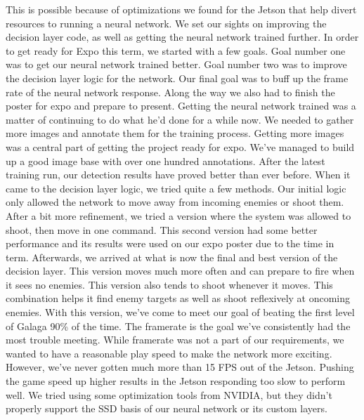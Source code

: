 \documentclass[onecolumn, draftclsnofoot,10pt, compsoc]{IEEEtran}
\begin{document}
This is possible because of optimizations we found for the Jetson that help divert resources to running a neural network.
We set our sights on improving the decision layer code, as well as getting the neural network trained further.
\newline\newline
In order to get ready for Expo this term, we started with a few goals.
Goal number one was to get our neural network trained better.
Goal number two was to improve the decision layer logic for the network.
Our final goal was to buff up the frame rate of the neural network response.
Along the way we also had to finish the poster for expo and prepare to present.
\newline\newline
Getting the neural network trained was a matter of continuing to do what he'd done for a while now.
We needed to gather more images and annotate them for the training process.
Getting more images was a central part of getting the project ready for expo.
We've managed to build up a good image base with over one hundred annotations.
After the latest training run, our detection results have proved better than ever before.
\newline\newline
When it came to the decision layer logic, we tried quite a few methods.
Our initial logic only allowed the network to move away from incoming enemies or shoot them.
After a bit more refinement, we tried a version where the system was allowed to shoot, then move in one command.
This second version had some better performance and its results were used on our expo poster due to the time in term.
Afterwards, we arrived at what is now the final and best version of the decision layer.
This version moves much more often and can prepare to fire when it sees no enemies.
This version also tends to shoot whenever it moves.
This combination helps it find enemy targets as well as shoot reflexively at oncoming enemies.
With this version, we've come to meet our goal of beating the first level of Galaga 90\% of the time.
\newline\newline
The framerate is the goal we've consistently had the most trouble meeting.
While framerate was not a part of our requirements, we wanted to have a reasonable play speed to make the network more exciting.
However, we've never gotten much more than 15 FPS out of the Jetson. 
Pushing the game speed up higher results in the Jetson responding too slow to perform well.
We tried using some optimization tools from NVIDIA, but they didn't properly support the SSD basis of our neural network or its custom layers.
\end{document}
